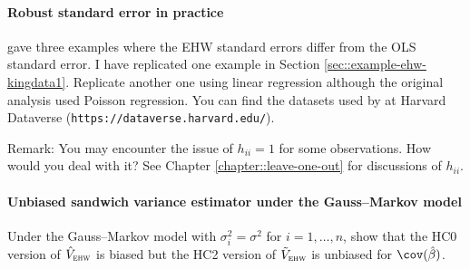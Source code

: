 \paragraph{Robust standard error in practice}
\citet{king2015robust} gave three examples where the EHW standard errors differ from the OLS standard error. I have replicated one example in Section \ref{sec::example-ehw-kingdata1}. Replicate another one using linear regression although the original analysis used Poisson regression. You can find the datasets used by \citet{king2015robust} at Harvard Dataverse (\texttt{https://dataverse.harvard.edu/}). 


Remark: You may encounter the issue of $h_{ii} = 1$ for some observations. How would you deal with it? See Chapter \ref{chapter::leave-one-out} for discussions of  $h_{ii}$. 




\paragraph{Unbiased sandwich variance estimator under the Gauss--Markov model}\label{hw::ehw-unbiased-hc2}

Under the Gauss--Markov model with $\sigma_i^2 = \sigma^2$ for $i=1,\ldots, n$, show that the HC0 version of $\hat{V}_{\textsc{ehw}} $ is biased but the HC2 version of $\tilde{V}_{\textsc{ehw}} $ is unbiased  for $\cov(\hat{\beta})$. 





